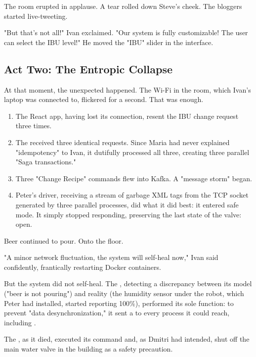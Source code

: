 The room erupted in applause. A tear rolled down Steve's cheek. The bloggers started live-tweeting.

"But that's not all!" Ivan exclaimed. "Our system is fully customizable! The user can select the IBU level!" He moved the "IBU" slider in the interface.

\subsection*{Act Two: The Entropic Collapse}

At that moment, the unexpected happened. The Wi-Fi in the room, which Ivan's laptop was connected to, flickered for a second. That was enough.

\begin{enumerate}
    \item The React app, having lost its connection, resent the IBU change request three times.
    \item The  received three identical requests. Since Maria had never explained "idempotency" to Ivan, it dutifully processed all three, creating three parallel "Saga transactions."
    \item Three "Change Recipe" commands flew into Kafka. A "message storm" began.
    \item Peter's driver, receiving a stream of garbage XML tags from the TCP socket generated by three parallel processes, did what it did best: it entered safe mode. It simply stopped responding, preserving the last state of the valve: open.
\end{enumerate}

Beer continued to pour. Onto the floor.

"A minor network fluctuation, the system will self-heal now," Ivan said confidently, frantically restarting Docker containers.

But the system did not self-heal. The , detecting a discrepancy between its model ("beer is not pouring") and reality (the humidity sensor under the robot, which Peter had installed, started reporting 100\%), performed its sole function: to prevent "data desynchronization," it sent a  to every process it could reach, including .

The , as it died, executed its  command and, as Dmitri had intended, shut off the main water valve in the building as a safety precaution.

